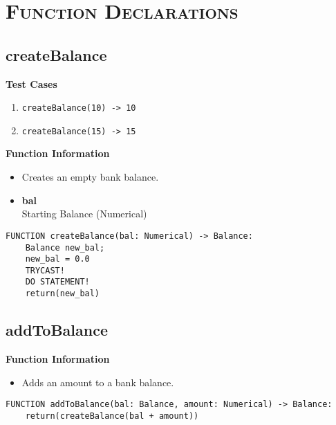 
\section{\textsc{Function Declarations}}
\clearpage

\subsection{createBalance}
\textbf{Test Cases}
\begin{enumerate}
	\setlength{\itemsep}{5pt}
	\setlength{\parskip}{0pt}
	\setlength{\parsep}{0pt}
	\item \verb|createBalance(10) -> 10|
	\item \verb|createBalance(15) -> 15|
\end{enumerate}

\textbf{Function Information}
\begin{itemize}
	\setlength{\itemsep}{5pt}
	\setlength{\parskip}{0pt}
	\setlength{\parsep}{0pt}
	\item Creates an empty bank balance.
	\item \textbf{bal} \\ Starting Balance (Numerical)
\end{itemize}

\begin{verbatim}
FUNCTION createBalance(bal: Numerical) -> Balance:
	Balance new_bal;
	new_bal = 0.0
	TRYCAST!
	DO STATEMENT!
	return(new_bal)
\end{verbatim}

\clearpage

\subsection{addToBalance}
\textbf{Function Information}
\begin{itemize}
	\setlength{\itemsep}{5pt}
	\setlength{\parskip}{0pt}
	\setlength{\parsep}{0pt}
	\item Adds an amount to a bank balance.
\end{itemize}

\begin{verbatim}
FUNCTION addToBalance(bal: Balance, amount: Numerical) -> Balance:
	return(createBalance(bal + amount))
\end{verbatim}

